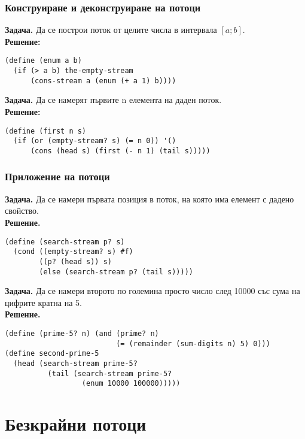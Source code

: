 \documentclass{beamer}
\begin{document}
\begin{frame}[fragile]
  \frametitle{Конструиране и деконструиране на потоци}

  \textbf{Задача.} Да се построи поток от целите числа в интервала $[a; b]$.\\
  \pause
  \textbf{Решение:}
\begin{verbatim}
(define (enum a b)
  (if (> a b) the-empty-stream
      (cons-stream a (enum (+ a 1) b))))
\end{verbatim}
  \pause
  \textbf{Задача.} Да се намерят първите n елемента на даден поток.\\
  \pause
  \textbf{Решение:}
\begin{verbatim}
(define (first n s)
  (if (or (empty-stream? s) (= n 0)) '()
      (cons (head s) (first (- n 1) (tail s)))))
\end{verbatim}
\end{frame}

\begin{frame}[fragile]
  \frametitle{Приложение на потоци}
  \small
  \textbf{Задача.} Да се намери първата позиция в поток, на която има елемент с дадено свойство.\\
  \pause
  \textbf{Решение.}
\begin{verbatim}
(define (search-stream p? s)
  (cond ((empty-stream? s) #f)
        ((p? (head s)) s)
        (else (search-stream p? (tail s)))))
\end{verbatim}
  \pause
  \textbf{Задача.} Да се намери второто по големина просто число след 10000 със сума на цифрите кратна на 5.\\
  \pause
  \textbf{Решение.}
\begin{verbatim}
(define (prime-5? n) (and (prime? n)
                          (= (remainder (sum-digits n) 5) 0)))
(define second-prime-5
  (head (search-stream prime-5?
          (tail (search-stream prime-5?
                  (enum 10000 100000)))))
\end{verbatim}
\end{frame}

\section{Безкрайни потоци}
\end{document}
